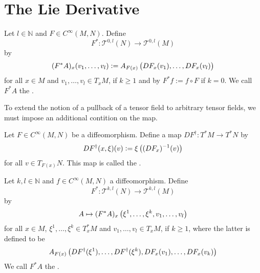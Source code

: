 \section*{The Lie Derivative}

\begin{definition}[Pullback]
	Let $l \in \mathbb{N}$ and $F \in C^\infty(M,N)$. Define 
	\begin{equation*}
		F^* : \mathcal{T}^{0,l}(N) \to \mathcal{T}^{0,l}(M)
	\end{equation*}
	\noindent by
	\begin{equation*}
		(F^*A)_x(v_1,\dots,v_l) := A_{F(x)}\del[1]{DF_x(v_1),\dots,DF_x(v_l)}
	\end{equation*}
	\noindent for all $x \in M$ and $v_1,\dots,v_l \in T_xM$, if $k \geq 1$ and by $F^*f := f \circ F$ if $k = 0$. We call $F^*A$ the .
\end{definition}

To extend the notion of a pullback of a tensor field to arbitrary tensor fields, we must impose an additional contition on the map.

\begin{definition}
	Let $F \in C^\infty(M,N)$ be a diffeomorphism. Define a map $DF^\dagger : T^*M \to T^*N$ by
	\begin{equation*}
		DF^\dagger(x,\xi)(v) := \xi\del[1]{(DF_x)^{-1}(v)}
	\end{equation*}
	\noindent for all $v \in T_{F(x)}N$. This map is called the .
\end{definition}

\begin{definition}[Pullback]
	Let $k,l \in \mathbb{N}$ and $f \in C^\infty(M,N)$ a diffeomorphism. Define 
	\begin{equation*}
		F^* : \mathcal{T}^{k,l}(N) \to \mathcal{T}^{k,l}(M)
	\end{equation*}
	\noindent by
	\begin{equation*}
		A \mapsto (F^*A)_x\del[1]{\xi^1,\dots,\xi^k,v_1,\dots,v_l}
	\end{equation*}
	\noindent for all $x \in M$, $\xi^1,\dots,\xi^k \in T_x^*M$ and $v_1,\dots,v_l \in T_xM$, if $k \geq 1$, where the latter is defined to be
	\begin{equation*}
		A_{F(x)}\del[1]{DF^\dagger(\xi^1),\dots,DF^\dagger(\xi^k),DF_x(v_1),\dots,DF_x(v_k)}
	\end{equation*}
	We call $F^*A$ the .
\end{definition}


